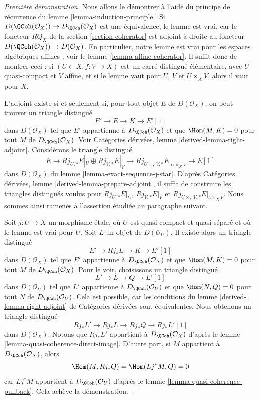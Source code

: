 \begin{proof}[Première démonstration]
Nous allons le démontrer à l'aide du principe de récurrence du
lemme \ref{lemma-induction-principle}.
Si $D(\QCoh(\mathcal{O}_X)) \to D_\QCoh(\mathcal{O}_X)$
est une équivalence, le lemme est vrai, car le foncteur
$RQ_X$ de la section \ref{section-coherator} est adjoint à droite au foncteur
$D(\QCoh(\mathcal{O}_X)) \to D(\mathcal{O}_X)$.
En particulier, notre lemme est vrai pour les espaces algébriques affines ; voir le
lemme \ref{lemma-affine-coherator}.
Il suffit donc de montrer ceci : si $(U \subset X, f : V \to X)$
est un carré distingué élémentaire, avec $U$ quasi-compact
et $V$ affine, et si le lemme vaut pour $U$, $V$ et $U \times_X V$,
alors il vaut pour $X$.

\medskip\noindent
L'adjoint existe si et seulement si, pour tout objet $E$ de
$D(\mathcal{O}_X)$, on peut trouver un triangle distingué
$$
E' \to E \to K \to E'[1]
$$
dans $D(\mathcal{O}_X)$
tel que $E'$ appartienne à $D_\QCoh(\mathcal{O}_X)$ et que
$\Hom(M, K) = 0$ pour tout $M$ de $D_\QCoh(\mathcal{O}_X)$. Voir
Catégories dérivées, lemme \ref{derived-lemma-right-adjoint}.
Considérons le triangle distingué
$$
E \to Rj_{U, *}E|_U \oplus Rj_{V, *}E|_V \to
Rj_{U \times_X V, *}E|_{U \times_X V} \to E[1]
$$
dans $D(\mathcal{O}_X)$ du lemme \ref{lemma-exact-sequence-j-star}.
D'après Catégories dérivées, lemme \ref{derived-lemma-prepare-adjoint},
il suffit de construire les triangles distingués voulus
pour $Rj_{U, *}E|_U$, $Rj_{V, *}E|_V$ et
$Rj_{U \times_X V, *}E|_{U \times_X V}$. Nous sommes ainsi ramenés à l'assertion
étudiée au paragraphe suivant.

\medskip\noindent
Soit $j : U \to X$ un morphisme étale, où
$U$ est quasi-compact et quasi-séparé et où le lemme est vrai pour $U$.
Soit $L$ un objet de $D(\mathcal{O}_U)$.
Il existe alors un triangle distingué
$$
E' \to Rj_*L \to K \to E'[1]
$$
dans $D(\mathcal{O}_X)$
tel que $E'$ appartienne à $D_\QCoh(\mathcal{O}_X)$ et que
$\Hom(M, K) = 0$ pour tout $M$ de $D_\QCoh(\mathcal{O}_X)$.
Pour le voir, choisissons un triangle distingué
$$
L' \to L \to Q \to L'[1]
$$
dans $D(\mathcal{O}_U)$ tel que $L'$ appartienne à $D_\QCoh(\mathcal{O}_U)$
et que $\Hom(N, Q) = 0$ pour tout $N$ de $D_\QCoh(\mathcal{O}_U)$.
Cela est possible, car les conditions du lemme
\ref{derived-lemma-right-adjoint} de Catégories dérivées
sont équivalentes.
Nous obtenons un triangle distingué
$$
Rj_*L' \to Rj_*L \to Rj_*Q \to Rj_*L'[1]
$$
dans $D(\mathcal{O}_X)$. Notons que $Rj_*L'$ appartient à $D_\QCoh(\mathcal{O}_X)$
d'après le lemme \ref{lemma-quasi-coherence-direct-image}.
D'autre part, si $M$ appartient à $D_\QCoh(\mathcal{O}_X)$, alors
$$
\Hom(M, Rj_*Q) = \Hom(Lj^*M, Q) = 0
$$
car $Lj^*M$ appartient à $D_\QCoh(\mathcal{O}_U)$ d'après le
lemme \ref{lemma-quasi-coherence-pullback}.
Cela achève la démonstration.
\end{proof}

